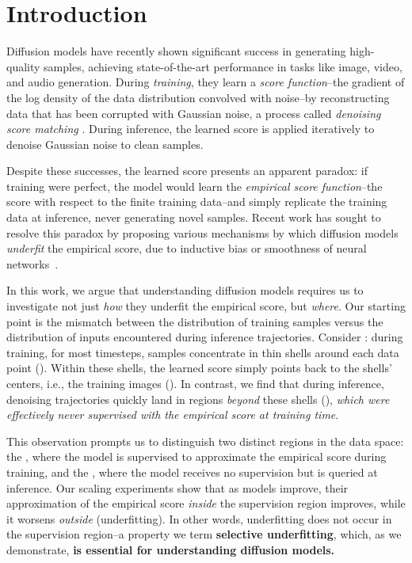 \section{Introduction}
Diffusion models \citep{sohl2015deep,ho2020denoising,song2020score} have recently shown significant success in generating high-quality samples, achieving state-of-the-art performance in tasks like image, video, and audio generation. During \emph{training}, they learn a \emph{score function}--the gradient of the log density of the data distribution convolved with noise--by reconstructing data that has been corrupted with Gaussian noise, a process called \emph{denoising score matching} \citep{vincent2011connection}. During inference, the learned score is applied iteratively to denoise Gaussian noise to clean samples.

Despite these successes, the learned score presents an apparent paradox: if training were perfect, the model would learn the \emph{empirical score function}--the score with respect to the finite training data--and simply replicate the training data at inference, never generating novel samples. Recent work has sought to resolve this paradox by proposing various mechanisms by which diffusion models \emph{underfit} the empirical score, due to inductive bias or smoothness of neural networks~\citep{kamb2024analytic,niedoba2024towards,scarvelis2023closed,pidstrigach2022score,yoon2023diffusion,yi2023generalization}.

In this work, we argue that understanding diffusion models requires us to investigate not just \emph{how} they underfit the empirical score, but \emph{where}. Our starting point is the mismatch between the distribution of training samples versus the distribution of inputs encountered during inference trajectories. Consider : during training, for most timesteps, samples concentrate in thin shells around each data point (). Within these shells, the learned score simply points back to the shells' centers, i.e., the training images (). In contrast, we find that during inference, denoising trajectories quickly land in regions \emph{beyond} these shells (), \emph{which were effectively never supervised with the empirical score at training time}.

This observation prompts us to distinguish two distinct regions in the data space: the , where the model is supervised to approximate the empirical score during training, and the , where the model receives no supervision but is queried at inference. Our scaling experiments show that as models improve, their approximation of the empirical score \emph{inside} the supervision region improves, while it worsens \emph{outside} (underfitting). In other words, underfitting does not occur in the supervision region--a property we term \textbf{selective underfitting}, which, as we demonstrate, \textbf{is essential for understanding diffusion models.}

